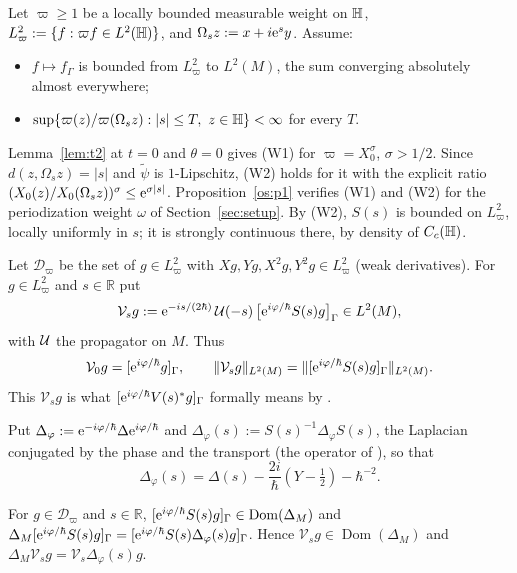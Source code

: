 Let $\varpi\ge1$ be a locally bounded measurable weight on $\mathbb{H}$, $L^2_\varpi:=\{f:\varpi f\in L^2(\mathbb{H})\}$, and $\Omega_sz:=x+i\mathrm{e}^sy$. Assume:
\begin{itemize}
\item[(W1)] $f\mapsto f_\Gamma$ is bounded from $L^2_\varpi$ to $L^2(M)$, the sum converging absolutely almost everywhere;
\item[(W2)] $\sup\{\varpi(z)/\varpi(\Omega_sz):|s|\le T,\ z\in\Hb\}<\infty$ for every $T$.
\end{itemize}
Lemma~\ref{lem:t2} at $t=0$ and $\theta=0$ gives (W1) for $\varpi=X_0^\sigma$, $\sigma>1/2$. Since $d(z,\Omega_sz)=|s|$ and
$\tilde\psi$ is $1$-Lipschitz, (W2) holds for it with the explicit ratio $(X_0(z)/X_0(\Omega_sz))^\sigma\le\mathrm{e}^{\sigma|s|}$.
Proposition~\ref{os:p1} verifies (W1) and (W2) for the periodization weight $\omega$ of Section~\ref{sec:setup}. By (W2), $S(s)$ is bounded on $L^2_\varpi$, locally uniformly in $s$; it is strongly continuous there, by density of $C_c(\mathbb{H})$.

Let $\mathcal D_\varpi$ be the set of $g\in L^2_\varpi$ with $Xg,Yg,X^2g,Y^2g\in L^2_\varpi$ (weak derivatives). For $g\in L^2_\varpi$ and $s\in\mathbb R$ put
\[
\mathcal V_sg:=\mathrm{e}^{-is/(2\hbar)}\,\mathcal{U}(-s)\,\bigl[\mathrm{e}^{i\varphi/\hbar}S(s)g\bigr]_\Gamma\in L^2(M),
\]
with $\mathcal{U}$ the propagator on $M$. Thus
\[
\mathcal V_0g=[\mathrm{e}^{i\varphi/\hbar}g]_\Gamma,\qquad
\lVert \mathcal V_sg\rVert_{L^2(M)}=\lVert [\mathrm{e}^{i\varphi/\hbar}S(s)g]_\Gamma\rVert_{L^2(M)}.
\]
This $\mathcal V_sg$ is what $[\mathrm{e}^{i\varphi/\hbar}V(s)^*g]_\Gamma$ formally means by \cite[(1.23)]{S}.

Put $\Delta_\varphi:=\mathrm{e}^{-i\varphi/\hbar}\Delta\mathrm{e}^{i\varphi/\hbar}$ and
$\Delta_\varphi(s):=S(s)^{-1}\Delta_\varphi S(s)$, the Laplacian conjugated by the phase and the transport (the operator of
\cite[Proposition~2.2 and (3.31)--(3.34)]{S}), so that
\[
  \Delta_\varphi(s)=\Delta(s)-\frac{2i}{\hbar}(Y-\tfrac12)-\hbar^{-2}.
\]

\begin{lemma}\label{lem:surf-lap}
For $g\in\mathcal D_\varpi$ and $s\in\mathbb R$, $[\mathrm{e}^{i\varphi/\hbar}S(s)g]_\Gamma\in\operatorname{Dom}(\Delta_M)$ and $\Delta_M[\mathrm{e}^{i\varphi/\hbar}S(s)g]_\Gamma=[\mathrm{e}^{i\varphi/\hbar}S(s)\Delta_\varphi(s)g]_\Gamma$. Hence $\mathcal V_sg\in\operatorname{Dom}(\Delta_M)$ and $\Delta_M\mathcal V_sg=\mathcal V_s\Delta_\varphi(s)g$.
\end{lemma}

